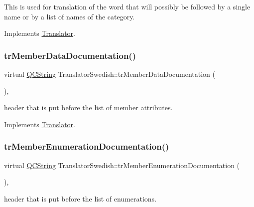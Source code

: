 This is used for translation of the word that will possibly be followed by a single name or by a list of names of the category. 

Implements \mbox{\hyperlink{class_translator}{Translator}}.

\mbox{\label{class_translator_swedish_a813fdb11c0e1636282c6ed93d009aa57}} 
\subsubsection{\texorpdfstring{trMemberDataDocumentation()}{trMemberDataDocumentation()}}
{\footnotesize\ttfamily virtual \mbox{\hyperlink{class_q_c_string}{Q\+C\+String}} Translator\+Swedish\+::tr\+Member\+Data\+Documentation (\begin{DoxyParamCaption}{ }\end{DoxyParamCaption})\hspace{0.3cm}{\ttfamily [inline]}, {\ttfamily [virtual]}}

header that is put before the list of member attributes. 

Implements \mbox{\hyperlink{class_translator}{Translator}}.

\mbox{\label{class_translator_swedish_a12cb959fd35723b61ec509ffbd2d7787}} 
\subsubsection{\texorpdfstring{trMemberEnumerationDocumentation()}{trMemberEnumerationDocumentation()}}
{\footnotesize\ttfamily virtual \mbox{\hyperlink{class_q_c_string}{Q\+C\+String}} Translator\+Swedish\+::tr\+Member\+Enumeration\+Documentation (\begin{DoxyParamCaption}{ }\end{DoxyParamCaption})\hspace{0.3cm}{\ttfamily [inline]}, {\ttfamily [virtual]}}

header that is put before the list of enumerations. 

